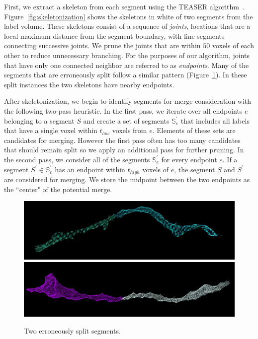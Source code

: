 First, we extract a skeleton from each segment using the TEASER algorithm~\cite{sato2000teasar,zhao2014automatic}.
Figure~\ref{fig:skeletonization} shows the skeletons in white of two segments from the label volume.
These skeletons consist of a sequence of \textit{joints}, locations that are a local maximum distance from the segment boundary, with line segments connecting successive joints.
We prune the joints that are within $50$ voxels of each other to reduce unnecessary branching.
For the purposes of our algorithm, joints that have only one connected neighbor are referred to as \textit{endpoints}.
Many of the segments that are erroneously split follow a similar pattern (Figure~\ref{fig:merge_candidates}).
In these split instances the two skeletons have nearby endpoints.

After skeletonization, we begin to identify segments for merge consideration with the following two-pass heuristic.
In the first pass, we iterate over all endpoints $e$ belonging to a segment $S$ and create a set of segments $\mathbb{S}_e^\prime$ that includes all labels that have a single voxel within $t_{low}$ voxels from $e$.
Elements of these sets are candidates for merging.
However the first pass often has too many candidates that should remain split so we apply an additional pass for further pruning.
In the second pass, we consider all of the segments $\mathbb{S}_e^\prime$ for every endpoint $e$.
If a segment $S^\prime \in \mathbb{S}_e^\prime$ has an endpoint within $t_{high}$ voxels of $e$, the segment $S$ and $S^\prime$ are considered for merging.
We store the midpoint between the two endpoints as the ``center" of the potential merge.

\begin{figure}[t]
	\centering
	\includegraphics[width=0.92\linewidth]{./figures/split_error1.png}
	\includegraphics[width=0.92\linewidth]{./figures/split_error2.png}
	\caption{Two erroneously split segments.}
	\label{fig:merge_candidates}
\end{figure}


